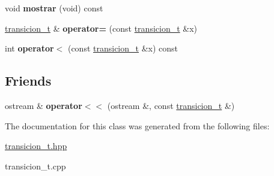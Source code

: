 \begin{DoxyCompactItemize}
\item 
\hypertarget{classtransicion__t_a8a63c11832c8bb6fe1f5214f46313adc}{void {\bfseries mostrar} (void) const }\label{classtransicion__t_a8a63c11832c8bb6fe1f5214f46313adc}

\item 
\hypertarget{classtransicion__t_a85a27b479e9e72888fab4c37968c7f8f}{\hyperlink{classtransicion__t}{transicion\-\_\-t} \& {\bfseries operator=} (const \hyperlink{classtransicion__t}{transicion\-\_\-t} \&x)}\label{classtransicion__t_a85a27b479e9e72888fab4c37968c7f8f}

\item 
\hypertarget{classtransicion__t_a44e7e81bc6b977f2903e361031232a47}{int {\bfseries operator$<$} (const \hyperlink{classtransicion__t}{transicion\-\_\-t} \&x) const }\label{classtransicion__t_a44e7e81bc6b977f2903e361031232a47}

\end{DoxyCompactItemize}
\subsection*{Friends}
\begin{DoxyCompactItemize}
\item 
\hypertarget{classtransicion__t_a84ca203b70d3ea4bccfbc90d945a37f3}{ostream \& {\bfseries operator$<$$<$} (ostream \&, const \hyperlink{classtransicion__t}{transicion\-\_\-t} \&)}\label{classtransicion__t_a84ca203b70d3ea4bccfbc90d945a37f3}

\end{DoxyCompactItemize}


The documentation for this class was generated from the following files\-:\begin{DoxyCompactItemize}
\item 
\hyperlink{transicion__t_8hpp}{transicion\-\_\-t.\-hpp}\item 
transicion\-\_\-t.\-cpp\end{DoxyCompactItemize}
